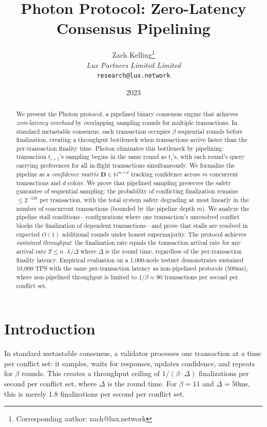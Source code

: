 \documentclass[11pt,a4paper]{article}
\title{\textbf{Photon Protocol: Zero-Latency Consensus Pipelining}}
\author{
Zach Kelling\thanks{Corresponding author: zach@lux.network}\\
\textit{Lux Partners Limited Limited}\\
\texttt{research@lux.network}
}
\date{2023}
\begin{document}
\luxcoverpage

\begin{abstract}
We present the Photon protocol, a pipelined binary consensus engine that achieves
\emph{zero-latency overhead} by overlapping sampling rounds for multiple transactions.
In standard metastable consensus, each transaction occupies $\beta$ sequential rounds
before finalization, creating a throughput bottleneck when transactions arrive faster
than the per-transaction finality time. Photon eliminates this bottleneck by pipelining:
transaction $t_{i+1}$'s sampling begins in the same round as $t_i$'s, with each round's
query carrying preferences for all in-flight transactions simultaneously.
We formalize the pipeline as a \emph{confidence matrix} $\mathbf{D} \in \mathbb{N}^{m \times d}$
tracking confidence across $m$ concurrent transactions and $d$ colors. We prove that
pipelined sampling preserves the safety guarantee of sequential sampling: the probability
of conflicting finalization remains $\leq 2^{-128}$ per transaction, with the total
system safety degrading at most linearly in the number of concurrent transactions (bounded
by the pipeline depth $m$).
We analyze the pipeline stall conditions---configurations where one transaction's
unresolved conflict blocks the finalization of dependent transactions---and prove that
stalls are resolved in expected $O(1)$ additional rounds under honest supermajority.
The protocol achieves \emph{sustained throughput}: the finalization rate equals the
transaction arrival rate for any arrival rate $T \leq n \cdot k / \Delta$ where $\Delta$
is the round time, regardless of the per-transaction finality latency.
Empirical evaluation on a 1,000-node testnet demonstrates sustained 10,000 TPS with
the same per-transaction latency as non-pipelined protocols (500ms), where non-pipelined
throughput is limited to $1/\beta \approx 90$ transactions per second per conflict set.
\end{abstract}

\tableofcontents
\newpage

\section{Introduction}
\label{sec:introduction}

In standard metastable consensus, a validator processes one transaction at a time per
conflict set: it samples, waits for responses, updates confidence, and repeats for
$\beta$ rounds. This creates a throughput ceiling of $1/(\beta \cdot \Delta)$ finalizations
per second per conflict set, where $\Delta$ is the round time. For $\beta = 11$ and
$\Delta = 50$ms, this is merely 1.8 finalizations per second per conflict set.
\end{document}
